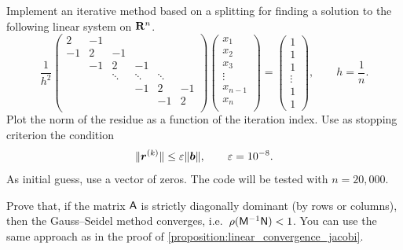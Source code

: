 \begin{compexercise}
    Implement an iterative method based on a splitting for finding a solution to the following linear system on $\mathbf R^n$.
    \[
        \frac{1}{h^2}
        \begin{pmatrix}
            2 & -1 \\
            -1 & 2  & -1 \\
               & -1 & 2      & -1 \\
               &    & \ddots & \ddots & \ddots & \\
               &    &        & -1    & 2      & -1 \\
               &    &        &     & -1      & 2 \\
        \end{pmatrix}
        \begin{pmatrix}
            x_1 \\
            x_2 \\
            x_3 \\
            \vdots \\
            x_{n-1} \\
            x_n \\
        \end{pmatrix}
        =
        \begin{pmatrix}
            1 \\
            1 \\
            1 \\
            \vdots \\
            1 \\
            1
        \end{pmatrix},
        \qquad
        h = \frac{1}{n}.
    \]
    Plot the norm of the residue as a function of the iteration index.
    Use as stopping criterion the condition
    \[
        \lVert\mathbf{\boldsymbol{r}}^{(k)}\rVert \leq \varepsilon \lVert\mathbf{\boldsymbol{b}}\rVert,
        \qquad \varepsilon = 10^{-8}.
    \]
    As initial guess, use a vector of zeros.
    The code will be tested with $n = 20,\!000$.
\end{compexercise}

\begin{exercise}
    \label{exercise:linear_convergence_gauss_seidel}
    Prove that, if the matrix $\mathsf A$ is strictly diagonally dominant (by rows or columns),
    then the Gauss--Seidel method converges, i.e.\ $\rho(\mathsf M^{-1} \mathsf N) < 1$.
    You can use the same approach as in the proof of \cref{proposition:linear_convergence_jacobi}.
\end{exercise}


